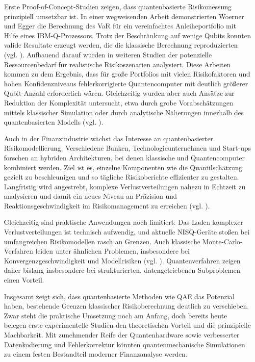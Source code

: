 Erste Proof-of-Concept-Studien zeigen, dass quantenbasierte Risikomessung prinzipiell umsetzbar ist. In einer wegweisenden Arbeit demonstrierten Woerner und Egger die Berechnung des VaR für ein vereinfachtes Anleiheportfolio mit Hilfe eines IBM-Q-Prozessors. Trotz der Beschränkung auf wenige Qubits konnten valide Resultate erzeugt werden, die die klassische Berechnung reproduzierten (vgl. \cite{egger_quantum_2020}). Aufbauend darauf wurden in weiteren Studien der potenzielle Ressourcenbedarf für realistische Risikoszenarien analysiert. Diese Arbeiten kommen zu dem Ergebnis, dass für große Portfolios mit vielen Risikofaktoren und hohen Konfidenzniveaus fehlerkorrigierte Quantencomputer mit deutlich größerer Qubit-Anzahl erforderlich wären. Gleichzeitig wurden aber auch Ansätze zur Reduktion der Komplexität untersucht, etwa durch grobe Vorabschätzungen mittels klassischer Simulation oder durch analytische Näherungen innerhalb des quantenbasierten Modells (vgl. \cite{martin2022}).

Auch in der Finanzindustrie wächst das Interesse an quantenbasierter Risikomodellierung. Verschiedene Banken, Technologieunternehmen und Start-ups forschen an hybriden Architekturen, bei denen klassische und Quantencomputer kombiniert werden. Ziel ist es, einzelne Komponenten wie die Quantilschätzung gezielt zu beschleunigen und so tägliche Risikoberichte effizienter zu gestalten. Langfristig wird angestrebt, komplexe Verlustverteilungen nahezu in Echtzeit zu analysieren und damit ein neues Niveau an Präzision und Reaktionsgeschwindigkeit im Risikomanagement zu erreichen (vgl. \cite{orus_quantum_2019, bouland_prospects_2020}).

Gleichzeitig sind praktische Anwendungen noch limitiert: Das Laden komplexer Verlustverteilungen ist technisch aufwendig, und aktuelle NISQ-Geräte stoßen bei umfangreichen Risikomodellen rasch an Grenzen. Auch klassische Monte-Carlo-Verfahren leiden unter ähnlichen Problemen, insbesondere bei Konvergenzgeschwindigkeit und Modellrisiken (vgl. \cite{MonteCarloSim2023}). Quantenverfahren zeigen daher bislang insbesondere bei strukturierten, datengetriebenen Subproblemen einen Vorteil.

Insgesamt zeigt sich, dass quantenbasierte Methoden wie QAE das Potenzial haben, bestehende Grenzen klassischer Risikoberechnung deutlich zu verschieben. Zwar steht die praktische Umsetzung noch am Anfang, doch bereits heute belegen erste experimentelle Studien den theoretischen Vorteil und die prinzipielle Machbarkeit. Mit zunehmender Reife der Quantenhardware sowie verbesserter Datenkodierung und Fehlerkorrektur könnten quantenmechanische Simulationen zu einem festen Bestandteil moderner Finanzanalyse werden.

